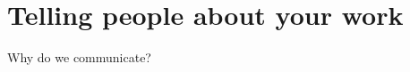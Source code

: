 \section[Communications strategies]{Telling people about your work}
\label{sec:communications_strategies}


\begin{frame}{Why do we communicate?}


\end{frame}

